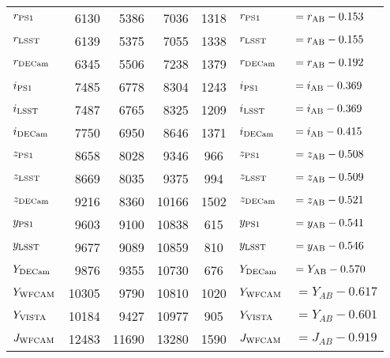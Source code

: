 \documentclass[usenatbib]{mnras}
\begin{document}
\begin{table*}[h*]
\begin{center}
\begin{tabular}{l r r r  c l l}
      $r_{\rm PS1}$         &    6130    & 	  5386    &    7036   &   1318       &  $r_{\rm PS1}   $       &$     = r_{\rm AB} - 0.153 $ \\ %
      $r_{\rm LSST}$       &     6139    &	  5375    &    7055   &   1338      &  $r_{\rm LSST}   $       &$    = r_{\rm AB} - 0.155 $ \\	
      $r_{\rm DECam}$   &      6345    &    5506    &    7238   &   1379      &  $r_{\rm DECam}$       &$   = r_{\rm AB} - 0.192 $ \\	     
      $i_{\rm PS1}$         &    7485    &     6778    &    8304   &   1243      &  $i_{\rm PS1}    $       &$   = i_{\rm AB} - 0.369 $ \\  %
      $i_{\rm LSST}$       &     7487    &	  6765    &     8325   &   1209      &  $i_{\rm LSST}   $       &$    = i_{\rm AB} - 0.369 $ \\   %
      $i_{\rm DECam}$   &      7750   &	  6950    &     8646    &   1371      &  $i_{\rm DECam} $     &$  = i_{\rm AB} - 0.415 $        \\	   
      $z_{\rm PS1}$        &    8658    &	 8028    &      9346   &      966      &  $z_{\rm PS1}   $      &$    = z_{\rm AB} - 0.508 $       \\
      $z_{\rm LSST}$      &     8669   & 	 8035    &      9375   &      994     &   $z_{\rm LSST}  $      &$    = z_{\rm AB} - 0.509 $     \\
      $z_{\rm DECam}$  &      9216   & 	 8360    &    10166   &   1502      &  $z_{\rm DECam} $     &$   = z_{\rm AB} - 0.521 $ \\
      $y_{\rm PS1}$      &       9603    &	 9100    &    10838  &     615       &  $y_{\rm PS1}    $       &$   = y_{\rm AB} -  0.541 $ \\
      $y_{\rm LSST}$      &      9677   &	 9089    &    10859  &     810         &  $y_{\rm LSST}  $      &$    = y_{\rm AB} - 0.546 $ \\
      $Y_{\rm DECam}$   &      9876   &	  9355    &      10730   &    676      &  $Y_{\rm DECam}  $   &$  =Y_{\rm AB} - 0.570 $ \\
      $Y_{\rm WFCAM}$    &   10305    &   9790      &   10810   &   1020     & $Y_{\rm WFCAM}$     &$ =  Y_{AB}  - 0.617$           \\
      $Y_{\rm VISTA}$     &    10184    &   9427      &   10977   &    905        & $Y_{\rm VISTA} $     &$ = Y_{AB}  - 0.601 $          \\
      $J_{\rm WFCAM} $    &    12483   &     11690  &    13280   &   1590      & $J_{\rm WFCAM}$     & $= J_{AB}    - 0.919 $          \\

\end{tabular}
\end{center}
\end{table*}
\end{document}
